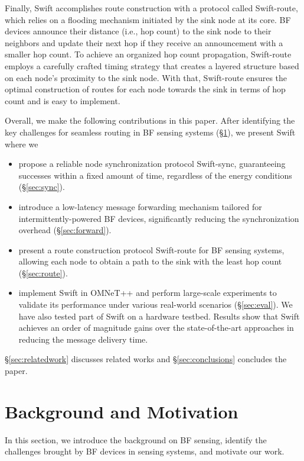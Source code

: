 \documentclass[lettersize,journal]{IEEEtran}
\newcommand{\ours}{Swift\xspace}
\newcommand{\sync}{Swift-sync\xspace}
\newcommand{\route}{Swift-route\xspace}
\begin{document}
Finally, \ours accomplishes route construction with a protocol called \route, which relies on a flooding mechanism initiated by the sink node at its core. BF devices announce their distance (i.e., hop count) to the sink node to their neighbors and update their next hop if they receive an announcement with a smaller hop count. To achieve an organized hop count propagation, \route employs a carefully crafted timing strategy that creates a layered structure based on each node's proximity to the sink node. With that, \route ensures the optimal construction of routes for each node towards the sink in terms of hop count and is easy to implement.

Overall, we make the following contributions in this paper. After identifying the key challenges for seamless routing in BF sensing systems (\S\ref{sec:motivation}), we present \ours where we 
\begin{itemize}
    \item propose a reliable node synchronization protocol \sync, guaranteeing successes within a fixed amount of time, regardless of the energy conditions (\S\ref{sec:sync}).
    \item introduce a low-latency message forwarding mechanism tailored for intermittently-powered BF devices, significantly reducing the synchronization overhead (\S\ref{sec:forward}). 
    \item present a route construction protocol \route for BF sensing systems, allowing each node to obtain a path to the sink with the least hop count (\S\ref{sec:route}). 
    \item implement \ours in OMNeT++ and perform large-scale experiments to validate its performance under various real-world scenarios (\S\ref{sec:eval}). We have also tested part of \ours on a hardware testbed. Results show that \ours achieves an order of magnitude gains over the state-of-the-art approaches in reducing the message delivery time.
\end{itemize}
\S\ref{sec:relatedwork} discusses related works and \S\ref{sec:conclusions} concludes the paper.




\section{Background and Motivation}
\label{sec:motivation}
In this section, we introduce the background on BF sensing, identify the challenges brought by BF devices in sensing systems, and motivate our work.
\end{document}
